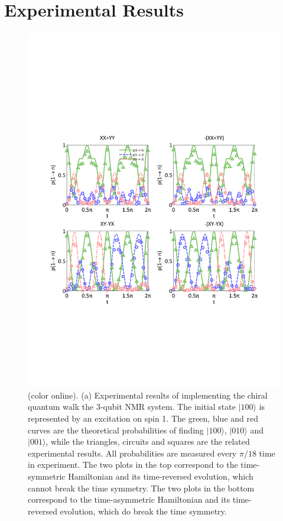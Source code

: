\documentclass[aps,pra,12pt,nofootinbib,superscriptaddress,longbibliography,showpacs]{revtex4-1}
\theoremstyle{plain}
\theoremstyle{definition}
\newcommand{\ket}[1]{\ensuremath{|#1\rangle}}
\begin{document}
\section{Experimental Results}

\begin{figure}[h] \centering
\includegraphics[width=0.9\columnwidth]{exp_1.pdf}
\caption{(color online). (a) Experimental results of implementing the chiral quantum walk the 3-qubit NMR system. The initial state $\ket{100}$ is represented by an excitation on spin 1. The green, blue and red curves are the theoretical probabilities of finding $\ket{100}$, $\ket{010}$ and $\ket{001}$, while the triangles, circuits and squares are the related experimental results. All probabilities are measured every $\pi/18$ time in experiment. The two plots in the top correspond to the time-symmetric Hamiltonian and its time-reversed evolution, which cannot break the time symmetry. The two plots in the bottom correspond to the time-asymmetric Hamiltonian and its time-reversed evolution, which do break the time symmetry.}\label{exp_1}
\end{figure}
\end{document}
